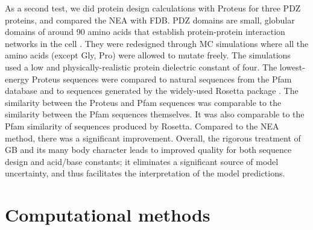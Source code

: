 \documentclass[a4paper,12pt]{article}
\begin{document}
As a second test, we did protein design calculations with Proteus for three PDZ proteins, and compared the NEA with FDB.
PDZ domains are small, globular domains of around 90 amino acids that establish protein-protein interaction networks in the
cell \cite{Harris01,Hung02,Tonikian08,Gfeller11,Subbaiah11,Sheperd11r}. They were redesigned through MC simulations where
all the amino acids (except Gly, Pro) were allowed to mutate freely. The simulations used a low and physically-realistic protein
dielectric constant of four. The lowest-energy Proteus sequences were compared to natural sequences from the Pfam database
and to sequences generated by the widely-used Rosetta package \cite{Kuhlman00,Dantas03,Rohl04,Baker06b}. The similarity
between the Proteus and Pfam sequences was comparable to the similarity between the Pfam sequences themselves. It was also
comparable to the Pfam similarity of sequences produced by Rosetta. Compared to the NEA method, there was a significant
improvement. Overall, the rigorous treatment of GB and its many body character leads to improved quality for both sequence
design and acid/base constants; it eliminates a significant source of model uncertainty, and thus facilitates the
interpretation of the model predictions.

\section{Computational methods}
\end{document}
